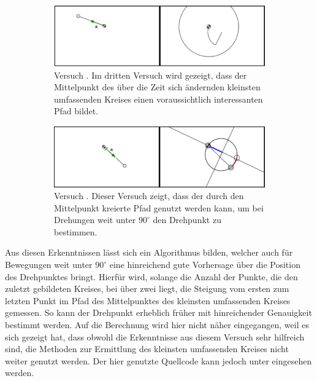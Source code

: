\begin{figure}
    \centering
    \begin{subfigure}[t]{0.45\textwidth}
        \includegraphics[width=\textwidth]{gfx/pendel1_3.png}
        \caption{Versuch . Im dritten Versuch wird gezeigt, dass der Mittelpunkt des über die Zeit sich ändernden kleinsten umfassenden Kreises einen voraussichtlich interessanten Pfad bildet.}\label{fig:pendel1_3}
    \end{subfigure}
    \begin{subfigure}[t]{0.45\textwidth}
        \includegraphics[width=\textwidth]{gfx/pendel1_4.png}
        \caption{Versuch . Dieser Versuch zeigt, dass der durch den Mittelpunkt kreierte Pfad genutzt werden kann, um bei Drehungen weit unter $90^\circ$ den Drehpunkt zu bestimmen.}\label{fig:pendel1_4}
    \end{subfigure}
    \caption[Versuche  und ]{}
    \label{fig:pendel1_3_4}
\end{figure}

Aus diesen Erkenntnissen lässt sich ein Algorithmus bilden, welcher auch für Bewegungen weit unter $90^\circ$ eine hinreichend gute Vorhersage über die Position des Drehpunktes bringt.
Hierfür wird, solange die Anzahl der Punkte, die den zuletzt gebildeten Kreises, bei über zwei liegt, die Steigung vom ersten zum letzten Punkt im Pfad des Mittelpunktes des kleinsten umfassenden Kreises gemessen.
So kann der Drehpunkt erheblich früher mit hinreichender Genauigkeit bestimmt werden.
Auf die Berechnung wird hier nicht näher eingegangen, weil es sich gezeigt hat, dass obwohl die Erkenntnisse aus diesem Versuch sehr hilfreich sind, die Methoden zur Ermittlung des kleinsten umfassenden Kreises nicht weiter genutzt werden.
Der hier genutzte Quellcode kann jedoch unter  eingesehen werden.

